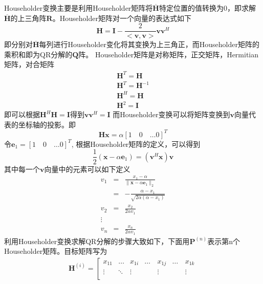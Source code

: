 \documentclass[bachelor,nocolorlinks, printoneside]{seuthesis} %
\begin{document}
\begin{Main}
Householder变换主要是利用Householder矩阵将$\overline{\mathbf{H}}$特定位置的值转换为0，即求解$\overline{\mathbf{H}}$的上三角阵$\mathbf{R}$。Householder矩阵对一个向量的表达式如下
\begin{equation}\label{key}
\mathbf{H} = \mathbf{I} - \frac{2}{<\mathbf{v},\mathbf{v}>} \mathbf{v}\mathbf{v}^H
\end{equation}
即分别对$\overline{\mathbf{H}}$每列进行Householder变化将其变换为上三角正，而Householder矩阵的乘积和即为QR分解的$\mathbf{Q}$阵。
Householder矩阵是对称矩阵，正交矩阵，Hermitian矩阵，对合矩阵
\begin{gather}\label{key}
\mathbf{H}^T = \mathbf{H}  \nonumber \\
\mathbf{H}^T = \mathbf{H}^{-1}  \nonumber\\
\mathbf{H}^H = \mathbf{H}  \nonumber\\
\mathbf{H}^2 = \mathbf{I} \nonumber
\end{gather}
即可以根据$\mathbf{H}^H\mathbf{H}=\mathbf{I}$得到$\mathbf{v}\mathbf{v}^H =\mathbf{I}$
而Householder变换可以将矩阵变换到$\mathbf{v}$向量代表的坐标轴的投影。即
\begin{equation}\label{key}
\mathbf{H}\mathbf{x} =\alpha [1 \quad 0 \quad \ldots 0]^T
\end{equation}
令$\mathbf{e}_1=[1 \quad 0 \quad \ldots 0]^T$,
根据Householder矩阵的定义，可以得到
\begin{equation}\label{key}
\frac{1}{2}(\mathbf{x}-\alpha \mathbf{e}_1)=(\mathbf{v}^H\mathbf{x})\mathbf{v}
\end{equation}
其中每一个$\mathbf{v}$向量中的元素可以如下定义
\begin{eqnarray}\label{key}
v_1 & = & \frac{x_1-\alpha}{\| \mathbf{x} - \alpha \mathbf{e}_1 \|_2} \nonumber \\
& = & -\frac{\alpha-x_1}{\sqrt{2\alpha(\alpha-x_1)}} \nonumber \\
v_2 & = & \frac{x_2}{2\alpha v_1} \nonumber  \\
\vdots \nonumber \\
v_n & = & \frac{x_n}{2\alpha v_1}
\end{eqnarray}
利用Householder变换求解QR分解的步骤大致如下，下面用$\mathbf{P}^{(n)}$表示第n个Householder矩阵。目标矩阵写为
\begin{eqnarray}\label{key}
\mathbf{H}^{(i)} =
\left[
\begin{array}{ccccccc}
x_{11} & \ldots & x_{1i} & \ldots & x_{1j} & \ldots & x_{1k} \\
\vdots & \ddots & \vdots & \quad & \vdots & \quad & \vdots \\

\end{array}
\end{eqnarray}
\end{Main}
\end{document}
